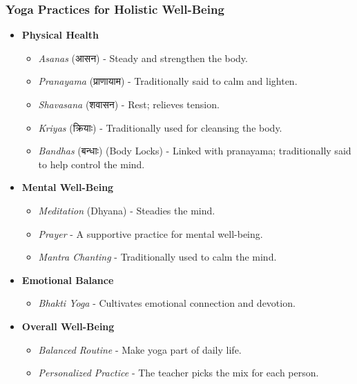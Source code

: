     


\begin{frame}[fragile]\frametitle{Yoga Practices for Holistic Well-Being}

	\begin{itemize} 
	\item \textbf{Physical Health} 
		\begin{itemize} 
			\item \textit{Asanas} (आसन) - Steady and strengthen the body.
			\item \textit{Pranayama} (प्राणायाम) - Traditionally said to calm and lighten.
			\item \textit{Shavasana} (शवासन) - Rest; relieves tension.
			\item \textit{Kriyas} (क्रियाः) - Traditionally used for cleansing the body.
			\item \textit{Bandhas} (बन्धाः) (Body Locks) - Linked with pranayama; traditionally said to help control the mind.
		\end{itemize}

	\item \textbf{Mental Well-Being}
		\begin{itemize}
			\item \textit{Meditation} (Dhyana) - Steadies the mind.
			\item \textit{Prayer} - A supportive practice for mental well-being.
			\item \textit{Mantra Chanting} - Traditionally used to calm the mind.
		\end{itemize}

	\item \textbf{Emotional Balance}
		\begin{itemize}
			\item \textit{Bhakti Yoga} - Cultivates emotional connection and devotion.
		\end{itemize}

	\item \textbf{Overall Well-Being}
		\begin{itemize}
			\item \textit{Balanced Routine} - Make yoga part of daily life.
			\item \textit{Personalized Practice} - The teacher picks the mix for each person.
		\end{itemize}
	\end{itemize}

\end{frame}


